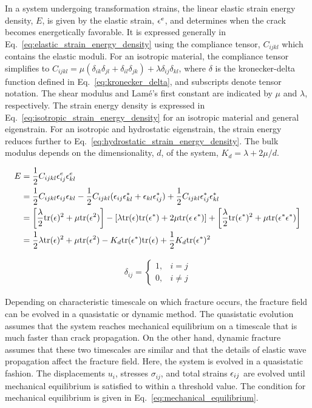 In a system undergoing transformation strains, the linear elastic strain energy density, $E$, is given by the elastic strain, $\epsilon^e$, and determines when the crack becomes energetically favorable. It is expressed generally in Eq.~\ref{eq:elastic_strain_energy_density} using the compliance tensor, $C_{ijkl}$ which contains the elastic moduli. For an isotropic material, the compliance tensor simplifies to $C_{ijkl}=\mu(\delta_{ik}\delta_{jl} + \delta_{il}\delta_{jk}) + \lambda \delta_{ij}\delta_{kl}$, where $\delta$ is the kronecker-delta function defined in Eq.~\ref{eq:kronecker_delta}, and subscripts denote tensor notation. The shear modulus and Lam\'e's first constant are indicated by $\mu$ and $\lambda$, respectively.  The strain energy density is expressed in Eq.~\ref{eq:isotropic_strain_energy_density} for an isotropic material and general eigenstrain. For an isotropic and hydrostatic eigenstrain, the strain energy reduces further to Eq.~\ref{eq:hydrostatic_strain_energy_density}. The bulk modulus depends on the dimensionality, $d$, of the system, $K_d = \lambda+2\mu/d$.


\begin{align}
    E &= \frac{1}{2} C_{ijkl} \epsilon^e_{ij}\epsilon^e_{kl}	 \label{eq:elastic_strain_energy_density}\\
	&= \frac{1}{2} C_{ijkl}\epsilon_{ij}\epsilon_{kl} - \frac{1}{2} C_{ijkl}(\epsilon_{ij}\epsilon^*_{kl} + \epsilon_{kl}\epsilon^*_{ij}) + \frac{1}{2} C_{ijkl}\epsilon^*_{ij}\epsilon^*_{kl} \notag\\
	&=\left[\frac{\lambda}{2} \text{tr}(\epsilon)^2 + \mu \text{tr}(\epsilon^2)\right]- \left[ \lambda \text{tr}(\epsilon)\text{tr}(\epsilon^*) + 2\mu\text{tr}(\epsilon\,\epsilon^*) \right] + \left[\frac{\lambda}{2} \text{tr}(\epsilon^*)^2 + \mu \text{tr}(\epsilon^*\epsilon^*)\right]\label{eq:isotropic_strain_energy_density}\\
	&= 	\frac{1}{2} \lambda \text{tr}(\epsilon)^2 + \mu\text{tr}(\epsilon^2) - K_d \text{tr}(\epsilon^*)\text{tr}(\epsilon) + \frac{1}{2}K_d \text{tr}(\epsilon^*)^2\label{eq:hydrostatic_strain_energy_density}
\end{align}

\begin{align} \label{eq:kronecker_delta}
	\delta_{ij} =
	\begin{cases}
		1, & i=j\\
		0, & i\ne j
	\end{cases}
\end{align}

Depending on characteristic timescale on which fracture occurs, the fracture field can be evolved in a quasistatic or dynamic method. The quasistatic evolution assumes that the system reaches mechanical equilibrium on a timescale that is much faster than crack propagation. On the other hand, dynamic fracture assumes that these two timescales are similar and that the details of elastic wave propagation affect the fracture field. Here, the system is evolved in a quasistatic fashion. The displacements $u_i$, stresses $\sigma_{ij}$, and total strains $\epsilon_{ij}$ are evolved until mechanical equilibrium is satisfied to within a threshold value. The condition for mechanical equilibrium is given in Eq.~\ref{eq:mechanical_equilibrium}.

